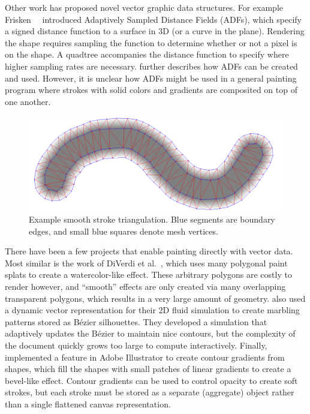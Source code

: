 \documentclass[review]{acmsiggraph}
\begin{document}
Other work has proposed novel vector graphic data structures. For example 
Frisken~\etal~
introduced Adaptively Sampled Distance Fields (ADFs), which specify a signed distance function to a surface in 3D
(or a curve in the plane).
%
Rendering the shape requires sampling the function to determine whether or not a pixel is on the shape.
A quadtree accompanies the distance function to specify where higher sampling rates are necessary. \cite{Bremer:2001:VCM}
further describes how ADFs can be created and used. However, it is unclear how ADFs might be used in a general
painting program where strokes with solid colors and gradients are composited on top of one another.

\begin{figure}
    \centering
        \includegraphics[width=\columnwidth]{images/stroke}
    \caption{Example smooth stroke triangulation. Blue segments are boundary edges, and small blue squares denote
    mesh vertices.}
    \label{fig:stroke}
\end{figure}

There have been a few projects that enable painting directly with vector data.  Most similar is the work of DiVerdi et al.~, which uses many polygonal paint splats to create a watercolor-like effect.  These arbitrary polygons are costly to render however, and ``smooth'' effects are only created via many overlapping transparent polygons, which results in a very large amount of geometry.  \cite{ando2010} also used a dynamic vector representation for their 2D fluid simulation to create marbling patterns stored as B\'{e}zier silhouettes.  They developed a simulation that adaptively updates the B\'{e}zier to maintain nice contours, but the complexity of the document quickly grows too large to compute interactively.  Finally, \cite{asente2013} implemented a feature in Adobe Illustrator to create contour gradients from shapes, which fill the shapes with small patches of linear gradients to create a bevel-like effect.  Contour gradients can be used to control opacity to create soft strokes, but each stroke must be stored as a separate (aggregate) object rather than a single flattened canvas representation.
\end{document}

